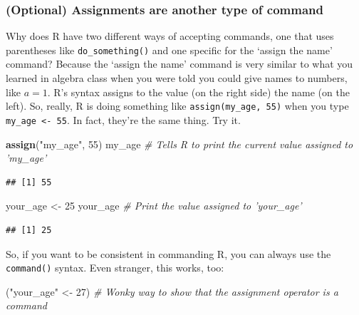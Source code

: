 \documentclass[]{article}
\newenvironment{Shaded}{\begin{snugshade}}{\end{snugshade}}
\newcommand{\KeywordTok}[1]{\textcolor[rgb]{0.13,0.29,0.53}{\textbf{#1}}}
\newcommand{\DecValTok}[1]{\textcolor[rgb]{0.00,0.00,0.81}{#1}}
\newcommand{\StringTok}[1]{\textcolor[rgb]{0.31,0.60,0.02}{#1}}
\newcommand{\CommentTok}[1]{\textcolor[rgb]{0.56,0.35,0.01}{\textit{#1}}}
\newcommand{\NormalTok}[1]{#1}
\begin{document}
\subsubsection{(Optional) Assignments are another type of
command}\label{optional-assignments-are-another-type-of-command}

Why does R have two different ways of accepting commands, one that uses
parentheses like \texttt{do\_something()} and one specific for the
`assign the name' command? Because the `assign the name' command is very
similar to what you learned in algebra class when you were told you
could give names to numbers, like \(a=1\). R's syntax assigns to the
value (on the right side) the name (on the left). So, really, R is doing
something like
\texttt{assign(\textquotesingle{}my\_age\textquotesingle{},\ 55)} when
you type \texttt{my\_age\ \textless{}-\ 55}. In fact, they're the same
thing. Try it.

\begin{Shaded}
\begin{Highlighting}[]
\KeywordTok{assign}\NormalTok{(}\StringTok{"my_age"}\NormalTok{, }\DecValTok{55}\NormalTok{)}
\NormalTok{my_age  }\CommentTok{# Tells R to print the current value assigned to 'my_age'}
\end{Highlighting}
\end{Shaded}

\begin{verbatim}
## [1] 55
\end{verbatim}

\begin{Shaded}
\begin{Highlighting}[]
\NormalTok{your_age <-}\StringTok{ }\DecValTok{25}
\NormalTok{your_age  }\CommentTok{# Print the value assigned to 'your_age' }
\end{Highlighting}
\end{Shaded}

\begin{verbatim}
## [1] 25
\end{verbatim}

So, if you want to be consistent in commanding R, you can always use the
\texttt{command()} syntax. Even stranger, this works, too:

\begin{Shaded}
\begin{Highlighting}[]
\NormalTok{(}\StringTok{"your_age"}\NormalTok{ <-}\StringTok{ }\DecValTok{27}\NormalTok{)  }\CommentTok{# Wonky way to show that the assignment operator is a command}
\end{Highlighting}
\end{Shaded}
\end{document}
